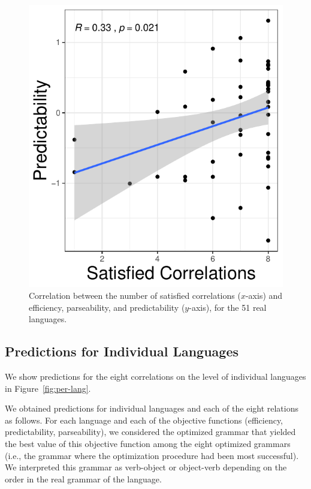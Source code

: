 \documentclass[10pt,twoside,lineno]{article}
\begin{document}
\begin{figure}[ht]
    \includegraphics[scale=.55]{../results/correlations/correlations-by-grammar/ground-corrs-predictability.pdf}

	\caption{Correlation between the number of satisfied correlations ($x$-axis) and efficiency, parseability, and predictability ($y$-axis), for the 51 real languages.}
    \label{fig:corr-eff-corr}
\end{figure}



\subsection{Predictions for Individual Languages}


We show predictions for the eight correlations on the level of individual languages in Figure~\ref{fig:per-lang}.

We obtained predictions for individual languages and each of the eight relations as follows.
For each language and each of the objective functions (efficiency, predictability, parseability), we considered the optimized grammar that yielded the best value of this objective function among the eight optimized grammars (i.e., the grammar where the optimization procedure had been most successful).
We interpreted this grammar as verb-object or object-verb depending on the order in the real grammar of the language.
\end{document}
